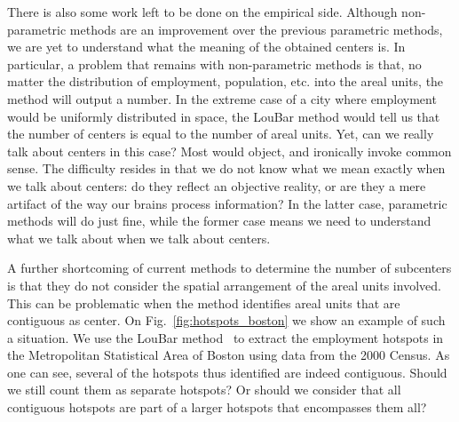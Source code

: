 There is also some work left to be done on the empirical side. Although
non-parametric methods are an improvement over the previous parametric methods,
we are yet to understand what the meaning of the obtained centers is. In
particular, a problem that remains with non-parametric methods is that, no
matter the distribution of employment, population, etc. into the areal units,
the method will output a number. In the extreme case of a city where employment
would be uniformly distributed in space, the LouBar method would tell us that
the number of centers is equal to the number of areal units. Yet, can we really
talk about centers in this case? Most would object, and ironically invoke common
sense. The difficulty resides in that we do not know what we mean exactly when
we talk about centers: do they reflect an objective reality, or are they a mere
artifact of the way our brains process information? In the latter case,
parametric methods will do just fine, while the former case means we need to
understand what we talk about when we talk about centers.  

A further shortcoming of current methods to determine the number of subcenters
is that they do not consider the spatial arrangement of the areal units
involved. This can be problematic when the method identifies areal units that
are contiguous as center. On Fig.~\ref{fig:hotspots_boston} we show an example
of such a situation. We use the LouBar method~\cite{Louail:2014} to extract the
employment hotspots in the Metropolitan Statistical Area of Boston using data
from the 2000 Census. As one can see, several of the hotspots thus identified
are indeed contiguous. Should we still count them as separate hotspots? Or
should we consider that all contiguous hotspots are part of a larger hotspots
that encompasses them all? 

